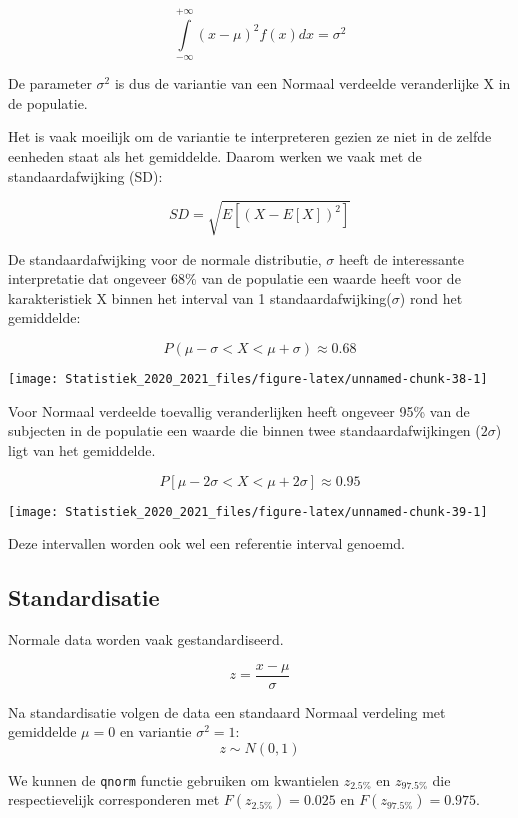 \documentclass[
  12pt,dutch,coursenotes]{book}
\theoremstyle{definition}
\theoremstyle{definition}
\theoremstyle{definition}
\theoremstyle{remark}
\begin{document}
\[\int \limits_{-\infty}^{+\infty} (x-\mu)^2 f(x) dx = \sigma^2\]

De parameter \(\sigma^2\) is dus de variantie van een Normaal verdeelde veranderlijke X in de populatie.

Het is vaak moeilijk om de variantie te interpreteren gezien ze niet in de zelfde eenheden staat als het gemiddelde. Daarom werken we vaak met de standaardafwijking (SD):

\[SD=\sqrt{E[(X-E[X])^2]}\]

De standaardafwijking voor de normale distributie, \(\sigma\) heeft de interessante interpretatie dat ongeveer 68\% van de populatie een waarde heeft voor de karakteristiek X binnen het interval van 1 standaardafwijking(\(\sigma\)) rond het gemiddelde:

\[P(\mu-\sigma < X < \mu + \sigma) \approx 0.68\]

\begin{center}\texttt{[image: Statistiek\_2020\_2021\_files/figure-latex/unnamed-chunk-38-1]} \end{center}

Voor Normaal verdeelde toevallig veranderlijken heeft ongeveer 95\% van de subjecten in de populatie een waarde die binnen twee standaardafwijkingen (\(2 \sigma\)) ligt van het gemiddelde.

\[P[\mu - 2 \sigma < X < \mu + 2 \sigma]\approx 0.95\]

\begin{center}\texttt{[image: Statistiek\_2020\_2021\_files/figure-latex/unnamed-chunk-39-1]} \end{center}

Deze intervallen worden ook wel een referentie interval genoemd.

\hypertarget{standardisatie}{%
\subsection{Standardisatie}\label{standardisatie}}

Normale data worden vaak gestandardiseerd.

\[z=\frac{x-\mu}{\sigma}\]

Na standardisatie volgen de data een standaard Normaal verdeling met gemiddelde \(\mu=0\) en variantie \(\sigma^2=1\):
\[z \sim N(0,1)\]

We kunnen de \texttt{qnorm} functie gebruiken om kwantielen \(z_{2.5\%}\) en \(z_{97.5\%}\) die respectievelijk corresponderen met \(F(z_{2.5\%})=0.025\) en \(F(z_{97.5\%})=0.975\).
\end{document}
